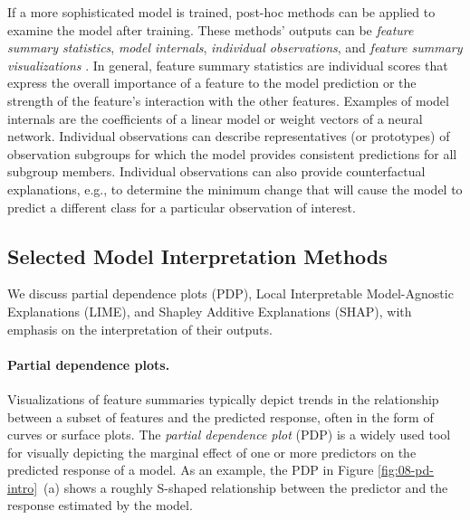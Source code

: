 \documentclass[
  oneside]{book}
\begin{document}
If a more sophisticated model is trained, post-hoc methods can be applied to examine the model after training.
These methods' outputs can be \emph{feature summary statistics}, \emph{model internals}, \emph{individual observations}, and \emph{feature summary visualizations} \autocite{molnar2020interpretable}.
In general, feature summary statistics are individual scores that express the overall importance of a feature to the model prediction or the strength of the feature's interaction with the other features.
Examples of model internals are the coefficients of a linear model or weight vectors of a neural network.
Individual observations can describe representatives (or prototypes) of observation subgroups for which the model provides consistent predictions for all subgroup members.
Individual observations can also provide counterfactual explanations, e.g., to determine the minimum change that will cause the model to predict a different class for a particular observation of interest.

\hypertarget{selected-model-interpretation-methods}{%
\subsection{Selected Model Interpretation Methods}\label{selected-model-interpretation-methods}}

We discuss partial dependence plots \autocite{Friedman:PDP2001} (PDP), Local Interpretable Model-Agnostic Explanations \autocite{RibeiroEtAl:KDD2016} (LIME), and Shapley Additive Explanations \autocite{Lundberg:SHAP2017} (SHAP), with emphasis on the interpretation of their outputs.

\paragraph*{Partial dependence plots.}

Visualizations of feature summaries typically depict trends in the relationship between a subset of features and the predicted response, often in the form of curves or surface plots.
The \emph{partial dependence plot} \autocite{Friedman:PDP2001} (PDP) is a widely used tool for visually depicting the marginal effect of one or more predictors on the predicted response of a model.
As an example, the PDP in Figure \ref{fig:08-pd-intro}~(a) shows a roughly S-shaped relationship between the predictor and the response estimated by the model.
\end{document}
